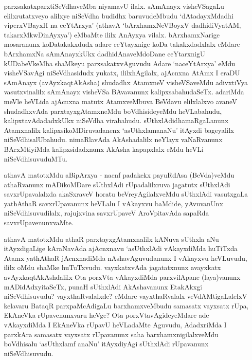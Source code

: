 \begin{artha}
parxsakatxparxtiSeVdhaveMba niyamavU ilalx. sAmAnayx visheVSagaLu	elilxrutatxveyo alilxye niSeVdha budidhx baruvudeMbudu `dAtadayxMdadhi viperxVBayxH na ceYtArxya' (athavA `bArxhamxNeVBoyxV dadhidiVyatAM, takarxMkwDinAyxya') eMbaMte ililx AnAyxya vilalx. bArxhamxNarige mosaranunx koDatakakxdudx adare ceYtayxnige koDa takakxdadxlalx eMdare bArxhamxNa sAmAnayxkUkx dadhidAnaveMdoDane ceYtarxnigU kUDabeVkeMba shaMkeyu parxsakatxvAguvudu Adare `naceYtArxya' eMdu visheVSavAgi niSeVdhasidudx yukatx, ililxhAgilalx, ajAcnxna AtAmx I eraDU sAmAnayx (avAyxkaqtAkAsha) shudadhx AtamxneV visheVSaveMdu adivxtiVya vasutxvinalilx sAmAnayx visheVSa BAvavanunx kalipxsabahudaSeTx. adariMda meVle heVLida ajAcnxna matutx AtamxveMbuva BeVdavu elilxlalxvo avaneV shudadhxvAda parxtayxgAtamxneMdu boVdhisideyeMdu heVLabahudu, kalipxtavAdadadxkUkx niSeVdha virabahudu. sUthxlAdidhamaRgaLanunx Atamxnalilx kalipxsikoMDiruvadanenx `asUthxlamanaNu' itAyxdi bageyalilx niSeVdhisalUbahudu. nimaRlavAda AkAshadalilx neYlayx vaNaRvanunx BArxMtiyiMda kalipxsidadxnunx AkAsha kapapxlalx eMdu heVLi niSeVdhisuvuduMTu. 
\end{artha}

\begin{artha}
athavA matotxMdu aBipArxya - nacnf padakekx payuRdAsa (BeVda)veMdu athaRvanunx mADikoMDare sUthxlAdi rUpadalilxruva jagatutx sUthxlAdi savxrUpavalalxda akaSxraveV horatu beVreyAgilalxveMdu sUthxlAdi vasutxgaLa yathAthaR savxrUpavanunx heVLalu I vAkayxvu baMdide, yAvuvanUnx niSeVdhisuvudilalx, rajujxvina savxrUpaveV AroVpitavAda sapaRda savxrUpavenunxvaMte. 
\end{artha}


\begin{artha}
athavA matotxMdu athaR parxtayxgAtamxnalilx kANuva sUthxla aNu itAyxdigaLige kAraNavAda ajAcnxnavu `asUthxlAdi vAkayxdiMda huTiTxda Atamx yathAthaR jAcnxnadiMda nAshavAguvudanunx I vAkayxvu heVLuvudu, ililx oMdu shaMke huTuTxvudu. vayxkatxvAda jagatatxnunx avayxkatx avAyxkaqtAkAshdalilx Ota porxVta vAkayxdiMda parxvilApane (laya)vanunx mADidAdxyitaSeTx, punaH sUthxlAdi AkAshavanunx EtakAkxgi niSeVdhisuvudu? vayxthaRvalalxde? eMdare vayxthaRvalalx veVdAMtigaLalelxV kelavaru BataqR parxpaMcAdigaLu barxhamxveMbudu samasatx vayxsatx rUpa, EkAneVka rUpavenunxvaru heVge? Ota porxVtavAgideyeMdare ade vAkayxdiMda I EkAneVka rUpavU heVLadaMte Aguvudu, AdadxriMda I parxkAra samasatx vayxsatx rUpavanunx saha barxhamxnigilalxveMdu boVdhisalu `asUthxlamf anaNu' itAyxdiyAgi sUthxlAdi rUpavanunx niSeVdhisuvudu.
\end{artha}

